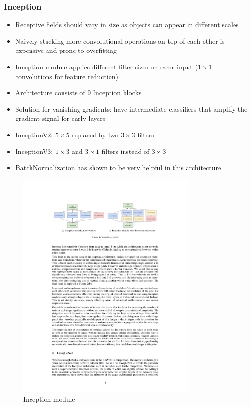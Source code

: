 \subsubsection{Inception}
\begin{itemize}
	\item Receptive fields should vary in size as objects can appear in different scales
	\item Naively stacking more convolutional operations on top of each other is expensive and prone to overfitting
	\item Inception module applies different filter sizes on same input ($1\times 1$ convolutions for feature reduction)
	\item Architecture consists of 9 Inception blocks
	\item Solution for vanishing gradients: have intermediate classifiers that amplify the gradient signal for early layers
	\item InceptionV2: $5\times 5$ replaced by two $3\times 3$ filters
	\item InceptionV3: $1\times 3$ and $3\times 1$ filters instead of $3\times 3$
	\item BatchNormalization has shown to be very helpful in this architecture
\end{itemize}
\begin{figure}[ht!]
	\centering
	\includegraphics[width=0.8\textwidth]{figures/CNN_Inception_module.pdf}
	\caption{Inception module}
	\label{fig:CNN_Inception_module}
\end{figure}
